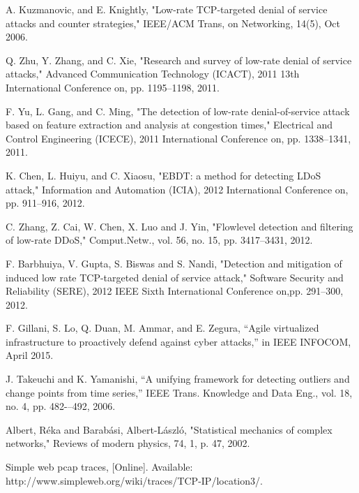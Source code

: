 \begin{thebibliography}{99}
A. Kuzmanovic, and E. Knightly,
"Low-rate TCP-targeted denial of service attacks and counter strategies,"
IEEE/ACM Trans, on Networking, 14(5), Oct 2006.

Q. Zhu, Y. Zhang, and C. Xie,
"Research and survey of low-rate denial of service attacks,"
Advanced Communication Technology (ICACT), 2011 13th International Conference on,
pp. 1195--1198, 2011.

F. Yu, L. Gang, and C. Ming,
"The detection of low-rate denial-of-service attack based on feature extraction and analysis at congestion times,"
Electrical and Control Engineering (ICECE), 2011 International Conference on,
pp. 1338--1341, 2011.

K. Chen, L. Huiyu, and C. Xiaosu,
"EBDT: a method for detecting LDoS attack,"
Information and Automation (ICIA), 2012 International Conference on,
pp. 911--916, 2012.

C. Zhang, Z. Cai, W. Chen, X. Luo and J. Yin,
"Flowlevel detection and filtering of low-rate DDoS,"
Comput.Netw., vol. 56, no. 15, pp. 3417--3431, 2012.

F. Barbhuiya, V. Gupta, S. Biswas and S. Nandi,
"Detection and mitigation of induced low rate TCP-targeted denial of service attack,"
Software Security and Reliability (SERE), 2012 IEEE Sixth International Conference on,pp. 291--300, 2012.

F. Gillani, S. Lo, Q. Duan, M. Ammar, and E. Zegura,
“Agile virtualized infrastructure to proactively defend against cyber attacks,”
in IEEE INFOCOM,
April 2015.

J. Takeuchi and K. Yamanishi,
“A unifying framework for detecting outliers and change points from time series,”
IEEE Trans. Knowledge and Data Eng.,
vol. 18, no. 4, pp. 482-–492, 2006.


Albert, R{\'e}ka and Barab{\'a}si, Albert-L{\'a}szl{\'o},
"Statistical mechanics of complex networks,"
Reviews of modern physics, 74, 1, p. 47, 2002.


Simple web pcap traces, [Online]. Available: http://www.simpleweb.org/wiki/traces/TCP-IP/location3/.

\end{thebibliography}
